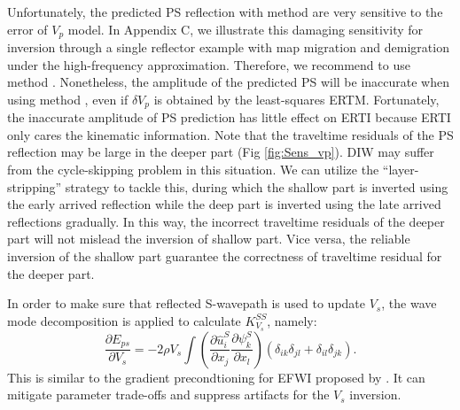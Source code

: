 Unfortunately, the predicted PS reflection with method {\bf\uppercase\expandafter{}} are
very sensitive to the error of $V_p$ model. 
In Appendix C, we illustrate this damaging sensitivity for inversion through a single reflector
example with
map migration and demigration under the high-frequency approximation.
Therefore, we recommend to use method {\bf\uppercase\expandafter{}}.
Nonetheless, the amplitude of the predicted PS will be inaccurate when using 
method {\bf\uppercase\expandafter{}}, even if $\delta V_p$ is obtained by the
least-squares ERTM. 
Fortunately, the inaccurate amplitude of PS prediction has little effect on ERTI because ERTI only
cares the kinematic information.
Note that 
the traveltime residuals of the PS reflection may be 
large in the deeper part (Fig \ref{fig:Sens_vp}). DIW may suffer from the cycle-skipping problem in this
situation. We can utilize the ``layer-stripping'' strategy to tackle this, during which the shallow part is
inverted using the early arrived reflection while the deep part is inverted using the late
arrived reflections gradually. In this way, the incorrect traveltime residuals of the deeper part will not
mislead the inversion of shallow part. Vice versa, the reliable inversion of the shallow part
guarantee
the correctness of traveltime residual for the deeper part.

In order to make sure that reflected S-wavepath is used to update $V_s$, the wave mode decomposition 
is applied to calculate $K^{SS}_{V_s}$, namely:
\begin{equation}
	\frac{\partial E_{ps}}{\partial V_s}=-2\rho V_s
	\int (\frac{\partial \hat{u}^S_{i}}{\partial
    x_j}\frac{\partial \psi^S_{k}}{\partial x_l})
	(\delta_{ik}\delta_{jl}+
	\delta_{il}\delta_{jk}).
    \label{eq:GradientVel_MD}
\end{equation}
This is similar to the gradient precondtioning for EFWI proposed by \cite{WangEtAl2017}. 
It can mitigate parameter trade-offs and suppress artifacts for the
$V_s$ inversion.
